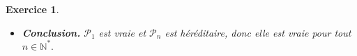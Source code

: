 \documentclass[10pt]{article}
\newtheorem{exo}{Exercice}
\begin{document}
\begin{exo}
\begin{itemize}
\begin{align*}
(1+x)^k\textcolor{red}{\times (1+x)}&\geq (1+kx)\textcolor{red}{\times (1+x)}\\
(1+x)^{k+1}&\geq 1\times 1+1\times x+kx\times 1+kx\times x\\
(1+x)^{k+1}&\geq 1+ \textcolor{green}{x+kx}+kx^2\\
(1+x)^{k+1}&\geq 1+ \textcolor{green}{(k+1)x}+kx^2\\
\end{align*}

\medskip

Or $kx^2\geq 0,$ car $k$ et $x^2$ sont positifs, donc $1+ (k+1)x+kx^2\geq 1+(k+1)x~;$ et par conséquent

\[(1+x)^{k+1}\geq 1+(k+1)x.\]

La propriété $\mathcal{P}_{k+1}$ est donc vraie.
\item[{\textbullet}] \textbf{Conclusion.} $\mathcal{P}_1$ est vraie et $\mathcal{P}_n$ est héréditaire, donc elle est vraie pour tout $n\in\mathbb{N}^*.$
\end{itemize}


\end{exo}
\end{document}
